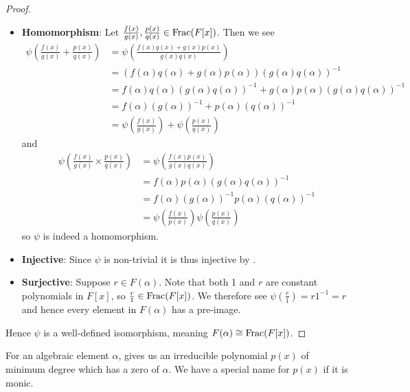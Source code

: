 \begin{proof}
\begin{itemize}
        \item \textbf{Homomorphism}: Let $\frac{f(x)}{g(x)}, \frac{p(x)}{q(x)} \in \mathrm{Frac}(F[x])$. Then we see
        \begin{align*}
            \psi\left(\frac{f(x)}{g(x)} + \frac{p(x)}{q(x)}\right) &= \psi\left(\frac{f(x)q(x) + g(x)p(x)}{g(x)q(x)}\right)\\
            &= \left(f(\alpha)q(\alpha) + g(\alpha)p(\alpha)\right)\left(g(\alpha)q(\alpha)\right)^{-1}\\
            &= f(\alpha)q(\alpha)\left(g(\alpha)q(\alpha)\right)^{-1} + g(\alpha)p(\alpha)\left(g(\alpha)q(\alpha)\right)^{-1}\\
            &= f(\alpha)(g(\alpha))^{-1} + p(\alpha)(q(\alpha))^{-1}\\
            &= \psi\left(\frac{f(x)}{g(x)}\right) + \psi\left(\frac{p(x)}{q(x)}\right)
        \end{align*}
        and
        \begin{align*}
            \psi\left(\frac{f(x)}{g(x)}\times \frac{p(x)}{q(x)}\right) &= \psi\left(\frac{f(x)p(x)}{g(x)q(x)}\right)\\
            &= f(\alpha)p(\alpha)\left(g(\alpha)q(\alpha)\right)^{-1}\\
            &= f(\alpha)(g(\alpha))^{-1}p(\alpha)(q(\alpha))^{-1}\\
            &= \psi\left(\frac{f(x)}{p(x)}\right)\psi\left(\frac{p(x)}{q(x)}\right)
        \end{align*}
        so $\psi$ is indeed a homomorphism.

        \item \textbf{Injective}: Since $\psi$ is non-trivial it is thus injective by .

        \item \textbf{Surjective}: Suppose $r \in F(\alpha)$. Note that both  1 and $r$ are constant polynomials in $F[x]$, so $\frac r1 \in \mathrm{Frac}(F[x])$. We therefore see $\psi\left(\frac r1\right) = r1^{-1} = r$ and hence every element in $F(\alpha)$ has a pre-image.
    \end{itemize}
    Hence $\psi$ is a well-defined isomorphism, meaning $F(\alpha) \cong \mathrm{Frac}(F[x])$.
\end{proof}

For an algebraic element $\alpha$,  gives us an irreducible polynomial $p(x)$ of minimum degree which has a zero of $\alpha$. We have a special name for $p(x)$ if it is monic.

